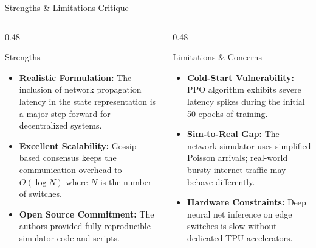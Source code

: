 \begin{frame}{Strengths \& Limitations Critique}
  \begin{columns}[T]
    \begin{column}{0.48\textwidth}
      \begin{strengthsbox}{Strengths}
        \begin{itemize}
          \item \textbf{Realistic Formulation:} The inclusion of network propagation latency in the state representation is a major step forward for decentralized systems.
          \item \textbf{Excellent Scalability:} Gossip-based consensus keeps the communication overhead to $O(\log N)$ where $N$ is the number of switches.
          \item \textbf{Open Source Commitment:} The authors provided fully reproducible simulator code and scripts.
        \end{itemize}
      \end{strengthsbox}
    \end{column}
    
    \begin{column}{0.48\textwidth}
      \begin{critiquebox}{Limitations \& Concerns}
        \begin{itemize}
          \item \textbf{Cold-Start Vulnerability:} PPO algorithm exhibits severe latency spikes during the initial 50 epochs of training.
          \item \textbf{Sim-to-Real Gap:} The network simulator uses simplified Poisson arrivals; real-world bursty internet traffic may behave differently.
          \item \textbf{Hardware Constraints:} Deep neural net inference on edge switches is slow without dedicated TPU accelerators.
        \end{itemize}
      \end{critiquebox}
    \end{column}
  \end{columns}
\end{frame}
